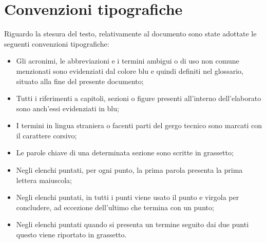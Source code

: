 
\chapter{Convenzioni tipografiche}

Riguardo la stesura del testo, relativamente al documento sono state adottate le seguenti convenzioni tipografiche:
\begin{itemize}
	\item Gli acronimi, le abbreviazioni e i termini ambigui o di uso non comune menzionati sono evidenziati dal colore blu e quindi definiti nel glossario, situato alla fine del presente documento;
	\item Tutti i riferimenti a capitoli, sezioni o figure presenti all'interno dell'elaborato sono anch'essi evidenziati in blu;
	\item I termini in lingua straniera o facenti parti del gergo tecnico sono marcati con il carattere corsivo;
	\item Le parole chiave di una determinata sezione sono scritte in grassetto;
	\item Negli elenchi puntati, per ogni punto, la prima parola presenta la prima lettera maiuscola;
    \item Negli elenchi puntati, in tutti i punti viene usato il punto e virgola per concludere, ad eccezione dell'ultimo che termina con un punto;
    \item Negli elenchi puntati quando si presenta un termine seguito dai due punti questo viene riportato in grassetto.
\end{itemize}

